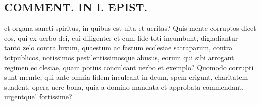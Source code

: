 \documentclass{article}
\begin{document}
\begin{pages}
\section*{COMMENT. IN I. EPIST. }
\marginpar{[ p.532 ]}\pstart et organa sancti spiritus, in quibus est uita et ueritas? Quis mente corruptos dicet eos, qui ex uerbo dei, cui diligenter et cum fide toti incumbunt, digladiantur tanto zelo contra luxum, quaestum ac fastum ecclesiae satraparum, contra totpublicos, notissimos pestilentissimosque abusus, eorum qui sibi arrogant regimen ec clesiae, quam potius conculcant uerbo et exemplo? Quomodo corrupti sunt memte, qui ante omnia fidem inculcant in deum, spem erigunt, charitatem suadent, opera uere bona, quia a domino mandata et approbata commendant, urgentque ́ fortissime?  \pend
{}
{}

\end{pages}
\end{document}
